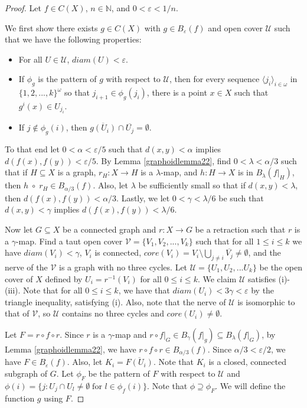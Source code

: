 \documentclass{amsart}
\numberwithin{equation}{section}
\begin{document}
\begin{proof}

Let $f\in C(X)$, $n\in \mathbb N$, and $0<\varepsilon<1/n$. 

We first show there exists $g\in C(X)$ with $g\in B_\varepsilon(f)$  and open cover $\mathcal{U}$ such that we have the following properties:
    \begin{itemize}
        \item[(i)]  For all $U\in \mathcal{U}$, $diam(U)<\varepsilon$.
        \item[(ii)] If $\phi_g$ is the pattern of $g$ with respect to $\mathcal{U}$, then for every sequence $\langle j_i \rangle_{i\in \omega}$ in $\{1,2,...,k\}^\omega$ so that $j_{i+1}\in \phi_g(j_i)$, there is a point $x\in X$ such that $g^i(x)\in U_{j_i}.$
        \item[(iii)] If $j\notin\phi_g(i)$, then $\overline{g(U_i)}\cap \overline{U_j}=\emptyset.$
    \end{itemize}


To that end let $0<\alpha<\varepsilon/5$ such that $d(x,y)<\alpha$ implies $d(f(x),f(y))<\varepsilon/5$. By Lemma \ref{graphoidlemma22}, find $0<\lambda<\alpha/3$ such that if $H\subseteq X$ is a graph, $r_H:X\to H$ is a $\lambda$-map, and $h:H\to X$ is in $B_\lambda(f|_H)$, then $h\;\circ\; r_H\in B_{\alpha/3}(f).$ Also, let $\lambda$ be sufficiently small so that if $d(x,y)<\lambda$, then $d(f(x),f(y))<\alpha/3$. Lastly, we let $0<\gamma<\lambda/6$ be such that $d(x,y)<\gamma$ implies $d(f(x),f(y))<\lambda/6$.

Now let $G\subseteq X$ be a connected graph and $r:X\to G$ be a retraction such that $r$ is a $\gamma$-map. Find a taut open cover $\mathcal{V}=\{V_1,V_2,...,V_k\}$ such that for all $1\leq i\leq k$ we have $diam(V_i)<\gamma$, $V_i$ is connected, $core(V_i)=V_i\setminus\bigcup_{j\neq i}\overline{V_j}\neq \emptyset$, and the nerve of the $\mathcal{V}$ is a graph with no three cycles. Let $\mathcal{U}=\{U_1,U_2,...U_k\}$ be the open cover of $X$ defined by $U_i=r^{-1}(V_i)$ for all $0\leq i\leq k$. We claim $\mathcal{U}$ satisfies (i)-(iii). Note that for all $0\leq i\leq k$, we have that $diam(U_i)<3\gamma<\varepsilon$ by the triangle inequality, satisfying (i). Also, note that the nerve of $\mathcal{U}$ is isomorphic to that of $\mathcal{V}$, so $\mathcal{U}$ contains no three cycles and $core(U_i)\neq\emptyset.$ 

Let $F=r\circ f\circ r$. Since $r$ is a $\gamma$-map and $r\circ f|_G\in B_\gamma(f|_g)\subseteq B_\lambda(f|_G)$, by Lemma \ref{graphoidlemma22}, we have $r\circ f\circ r\in B_{\alpha/3}(f).$ Since $\alpha/3<\varepsilon/2$, we have $F\in B_\varepsilon(f).$ Also, let $K_i=\overline{F(U_i)}.$ Note that $K_i$ is a closed, connected subgraph of $G$. Let $\phi_F$ be the pattern of $F$ with respect to $\mathcal{U}$ and $\phi(i)=\{j:U_j\cap U_l\neq \emptyset\; \text{for } l\in \phi_f(i)\}$. Note that $\phi \supseteq \phi_F$. We will define the function $g$ using $F$.


\end{proof}
\end{document}
